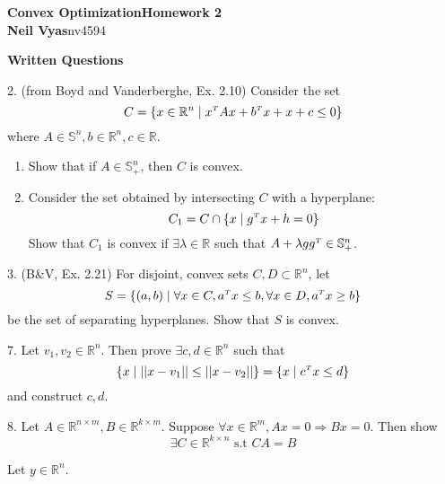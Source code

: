 \documentclass{article}
\newcommand{\qgroup}[1]{
  {\sffamily
  \textbf{#1}\vspace{-5pt} \\
  \makebox[\linewidth]{\rule{\linewidth}{2pt}} 
  }
}
\newcommand{\tr}[1]{\ensuremath{#1^{\mathsmaller T}}}
\newcommand{\R}{\ensuremath{\mathbb{R}}}
\newcommand{\Sym}{\ensuremath{\mathbb{S}}}
\begin{document}
\setlength{\abovedisplayskip}{0pt}
\setlength{\belowdisplayskip}{0pt}
\setlength{\abovedisplayshortskip}{0pt}
\setlength{\belowdisplayshortskip}{0pt}

{\sffamily
\textbf{Convex Optimization}\hfill\textbf{Homework 2}\vspace{-5pt}
\makebox[\linewidth]{\rule{\linewidth}{2pt}} \\
\textbf{Neil Vyas}\hfill nv4594\\
}

\qgroup{Written Questions}
2. (from Boyd and Vanderberghe, Ex. 2.10) Consider the set
$$ C = \{ x \in \R^n \mid \tr{x}Ax + \tr{b}x + x + c \leq 0 \} $$
where $A\in\Sym^n, b\in\R^n, c\in\R$.
\begin{enumerate}[label=(\alph*)]
  \item Show that if $A\in\Sym^n_+$, then $C$ is convex. \\
  \item Consider the set obtained by intersecting $C$ with a hyperplane: 
    $$ C_1 = C \cap \{x \mid \tr{g}x + h = 0 \} $$
    Show that $C_1$ is convex if $\exists \lambda\in\R $ such that $A + \lambda g\tr{g} \in \Sym^n_+$. \\
\end{enumerate}

3. (B\&V, Ex. 2.21) For disjoint, convex sets $C,D \subset \R^n$, let 
$$ S = \{ (a,b) \mid \forall x\in C, \tr{a}x \leq b, \forall x \in D, \tr{a}x \geq b \} $$
be the set of separating hyperplanes. Show that $S$ is convex.

7. Let $v_1, v_2 \in \R^n$. Then prove $\exists c,d \in \R^n$ such that 
$$ \{ x \mid ||x-v_1|| \leq ||x-v_2|| \} = \{x \mid \tr{c}x \leq d\} $$
and construct $c,d$.

8. Let $A \in \R^{n \times m}, B \in \R^{k \times m}$. Suppose $\forall x\in\R^m, Ax = 0 \Rightarrow Bx =0$. Then show
$$\exists C\in\R^{k \times n} \text{ s.t } CA = B  $$

Let $y \in \R^n$. 
\end{document}
